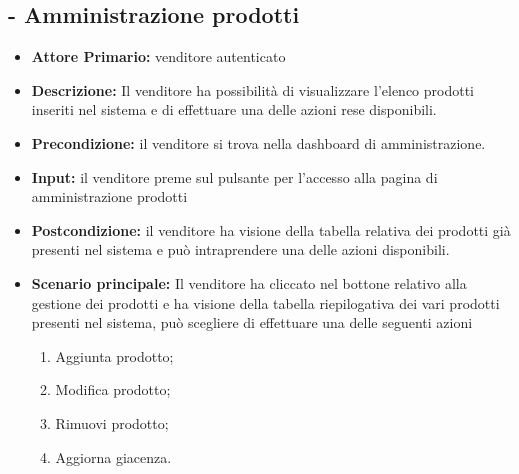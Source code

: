 \subsection{ - Amministrazione prodotti}
\begin{itemize}
    \item \textbf{Attore Primario:}  venditore autenticato
    \item \textbf{Descrizione:} Il venditore ha possibilità di visualizzare l’elenco prodotti inseriti nel sistema e di effettuare una delle azioni rese disponibili.
    \item \textbf{Precondizione:} il venditore si trova nella dashboard di amministrazione.
    \item \textbf{Input:} il venditore preme sul pulsante per l'accesso alla pagina di amministrazione prodotti
    \item \textbf{Postcondizione:} il venditore ha visione della tabella relativa dei prodotti già presenti nel sistema e può intraprendere una delle azioni disponibili.
    \item \textbf{Scenario principale:} Il venditore ha cliccato nel bottone relativo alla gestione dei prodotti e ha visione della tabella riepilogativa dei vari prodotti presenti nel sistema, può scegliere di effettuare una delle seguenti azioni 
    \begin{enumerate}
        \item Aggiunta prodotto;
        \item Modifica prodotto;
        \item Rimuovi prodotto;
        \item Aggiorna giacenza.
    \end{enumerate}
\end{itemize}

\stepsubUserCase
